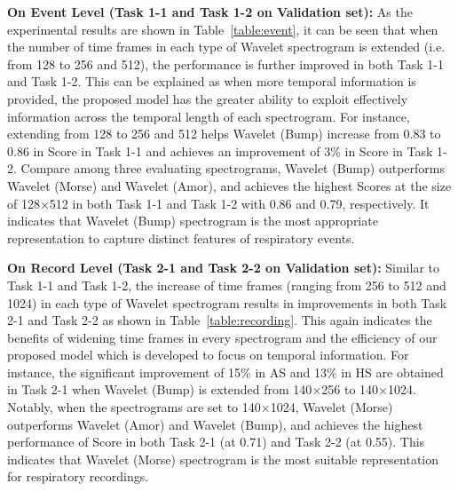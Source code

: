 \documentclass[conference]{IEEEtran}
\begin{document}
\textbf{On Event Level (Task 1-1 and Task 1-2 on Validation set):} As the experimental results are shown in Table~\ref{table:event}, it can be seen that when the number of time frames in each type of Wavelet spectrogram is extended (i.e. from 128 to 256 and 512), the performance is further improved in both Task 1-1 and Task 1-2. 
This can be explained as when more temporal information is provided, the proposed model has the greater ability to exploit effectively information across the temporal length of each spectrogram.
For instance, extending from 128 to 256 and 512 helps Wavelet (Bump) increase from 0.83 to 0.86 in Score in Task 1-1 and achieves an improvement of 3\% in Score in Task 1-2.  
Compare among three evaluating spectrograms, Wavelet (Bump) outperforms Wavelet (Morse) and Wavelet (Amor), and achieves the highest Scores at the size of 128$\times$512 in both Task 1-1 and Task 1-2 with 0.86 and 0.79, respectively. 
It indicates that Wavelet (Bump) spectrogram is the most appropriate representation to capture distinct features of respiratory events.

\textbf{On Record Level (Task 2-1 and Task 2-2 on Validation set):} Similar to Task 1-1 and Task 1-2, the increase of time frames (ranging from 256 to 512 and 1024) in each type of Wavelet spectrogram results in improvements in both Task 2-1 and Task 2-2 as shown in Table~\ref{table:recording}. 
This again indicates the benefits of widening time frames in every spectrogram and the efficiency of our proposed model which is developed to focus on temporal information. 
For instance, the significant improvement of 15\% in AS and 13\% in HS are obtained in Task 2-1 when Wavelet (Bump) is extended from 140$\times$256 to 140$\times$1024. 
Notably, when the spectrograms are set to 140$\times$1024, Wavelet (Morse) outperforms Wavelet (Amor) and Wavelet (Bump),  and achieves the highest performance of Score in both Task 2-1 (at 0.71) and Task 2-2 (at 0.55).
This indicates that Wavelet (Morse) spectrogram is the most suitable representation for respiratory recordings. 
\end{document}
